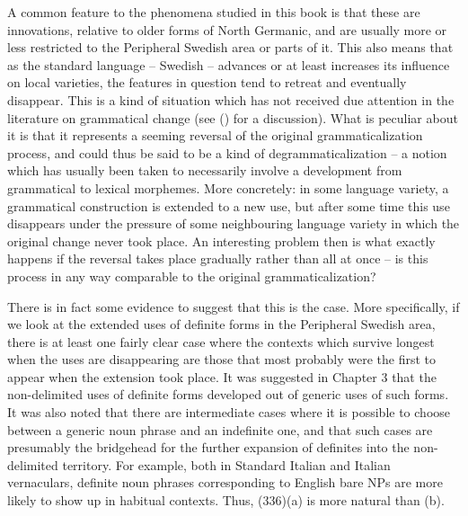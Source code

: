 
A common feature to the phenomena studied in this book is that these are innovations, relative to older forms of North Germanic, and are usually more or less restricted to the Peripheral Swedish area or parts of it. This also means that as the standard language – Swedish – advances or at least increases its influence on local varieties, the features in question tend to retreat and eventually disappear. This is a kind of situation which has not received due attention in the literature on grammatical change (see (\citet{Dahl2004}) for a discussion). What is peculiar about it is that it represents a seeming reversal of the original grammaticalization process, and could thus be said to be a kind of degrammaticalization – a notion which has usually been taken to necessarily involve a development from grammatical to lexical morphemes. More concretely: in some language variety, a grammatical construction is extended to a new use, but after some time this use disappears under the pressure of some neighbouring language variety in which the original change never took place. An interesting problem then is what exactly happens if the reversal takes place gradually rather than all at once – is this process in any way comparable to the original grammaticalization?


There is in fact some evidence to suggest that this is the case. More specifically, if we look at the extended uses of definite forms in the Peripheral Swedish area, there is at least one fairly clear case where the contexts which survive longest when the uses are disappearing are those that most probably were the first to appear when the extension took place. It was suggested in Chapter 3 that the non-delimited uses of definite forms developed out of generic uses of such forms. It was also noted that there are intermediate cases where it is possible to choose between a generic noun phrase and an indefinite one, and that such cases are presumably the bridgehead for the further expansion of definites into the non-delimited territory. For example, both in Standard Italian and Italian vernaculars, definite noun phrases corresponding to English bare NPs are more likely to show up in habitual contexts. Thus, (336)(a) is more natural than (b).

